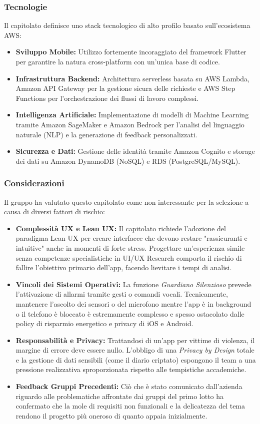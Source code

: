 \documentclass[a4paper, 10pt, colorlinks=true, linkcolor=black, urlcolor=blue, citecolor=blue, hidelinks]{article}
\begin{document}
\subsubsection{Tecnologie}
Il capitolato definisce uno stack tecnologico di alto profilo basato sull'ecosistema AWS:
\begin{itemize}
    \item \textbf{Sviluppo Mobile:} Utilizzo fortemente incoraggiato del framework Flutter per garantire la natura cross-platform con un'unica base di codice.
    \item \textbf{Infrastruttura Backend:} Architettura serverless basata su AWS Lambda, Amazon API Gateway per la gestione sicura delle richieste e AWS Step Functions per l'orchestrazione dei flussi di lavoro complessi.
    \item \textbf{Intelligenza Artificiale:} Implementazione di modelli di Machine Learning tramite Amazon SageMaker e Amazon Bedrock per l'analisi del linguaggio naturale (NLP) e la generazione di feedback personalizzati.
    \item \textbf{Sicurezza e Dati:} Gestione delle identità tramite Amazon Cognito e storage dei dati su Amazon DynamoDB (NoSQL) e RDS (PostgreSQL/MySQL).
\end{itemize}

\subsubsection{Considerazioni}
Il gruppo ha valutato questo capitolato come non interessante per la selezione a causa di diversi fattori di rischio:
\begin{itemize}
    \item \textbf{Complessità UX e Lean UX:} Il capitolato richiede l'adozione del paradigma Lean UX per creare interfacce che devono restare "rassicuranti e intuitive" anche in momenti di forte stress. Progettare un'esperienza simile senza competenze specialistiche in UI/UX Research comporta il rischio di fallire l'obiettivo primario dell'app, facendo lievitare i tempi di analisi.
    \item \textbf{Vincoli dei Sistemi Operativi:} La funzione \textit{Guardiano Silenzioso} prevede l'attivazione di allarmi tramite gesti o comandi vocali. Tecnicamente, mantenere l'ascolto dei sensori o del microfono mentre l'app è in background o il telefono è bloccato è estremamente complesso e spesso ostacolato dalle policy di risparmio energetico e privacy di iOS e Android.
    \item \textbf{Responsabilità e Privacy:} Trattandosi di un'app per vittime di violenza, il margine di errore deve essere nullo. L'obbligo di una \textit{Privacy by Design} totale e la gestione di dati sensibili (come il diario criptato) espongono il team a una pressione realizzativa sproporzionata rispetto alle tempistiche accademiche.
    \item \textbf{Feedback Gruppi Precedenti:} Ciò che è stato comunicato dall'azienda riguardo alle problematiche affrontate dai gruppi del primo lotto ha confermato che la mole di requisiti non funzionali e la delicatezza del tema rendono il progetto più oneroso di quanto appaia inizialmente.
\end{itemize}
\end{document}
